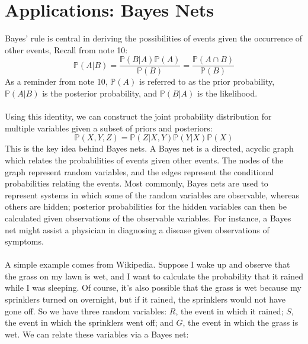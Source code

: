 \documentclass{article}
\begin{document}
\section*{Applications: Bayes Nets}
Bayes' rule is central in deriving the possibilities of events given the occurrence of other events, Recall from note 10:
$$\mathbb{P}(A|B) = \frac{\mathbb{P}(B | A)\mathbb{P}(A)}{\mathbb{P}(B)} = \frac{\mathbb{P}(A \cap B)}{\mathbb{P}(B)}$$
As a reminder from note 10, $\mathbb{P}(A)$ is referred to as the prior probability, $\mathbb{P}(A | B)$ is the posterior probability, and $\mathbb{P}(B | A)$ is the likelihood. \\\\
Using this identity, we can construct the joint probability distribution for multiple variables given a subset of priors and posteriors:
$$\mathbb{P}(X, Y, Z) = \mathbb{P}(Z|X, Y)\mathbb{P}(Y|X)\mathbb{P}(X)$$
This is the key idea behind Bayes nets. A Bayes net is a directed, acyclic graph which relates the probabilities of events given other events. The nodes of the graph represent random variables, and the edges represent the conditional probabilities relating the events. Most commonly, Bayes nets are used to represent systems in which some of the random variables are observable, whereas others are hidden; posterior probabilities for the hidden variables can then be calculated given observations of the observable variables. For instance, a Bayes net might assist a physician in diagnosing a disease given observations of symptoms. \\\\
A simple example comes from Wikipedia. Suppose I wake up and observe that the grass on my lawn is wet, and I want to calculate the probability that it rained while I was sleeping. Of course, it's also possible that the grass is wet because my sprinklers turned on overnight, but if it rained, the sprinklers would not have gone off. So we have three random variables: $R$, the event in which it rained; $S$, the event in which the sprinklers went off; and $G$, the event in which the grass is wet. We can relate these variables via a Bayes net:
\end{document}

